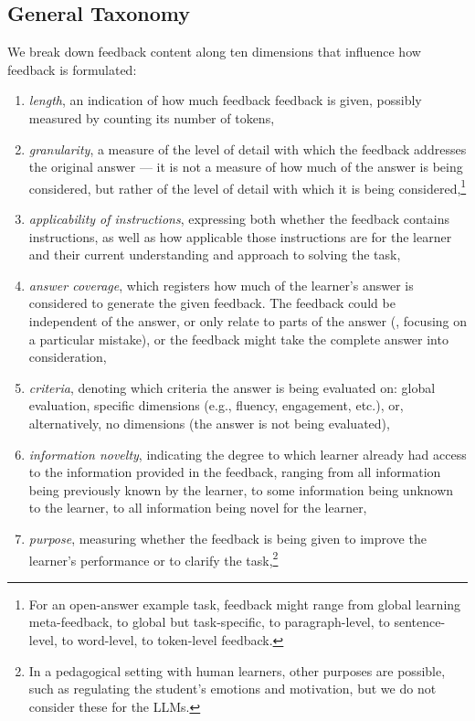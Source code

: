 \subsection{General Taxonomy}
\label{ssec:general_taxonomy}
We break down feedback content along ten dimensions that influence how feedback is formulated: 
\begin{enumerate}[itemsep=0.05em]
    \item \textit{length}, an indication of how much feedback feedback is given, possibly measured by counting its number of tokens,
    \item \textit{granularity}, a measure of the level of detail with which the feedback addresses the original answer --- it is not a measure of how much of the answer is being considered, but rather of the level of detail with which it is being considered,\footnote{For an open-answer example task, feedback might range from global learning meta-feedback, to global but task-specific, to paragraph-level, to sentence-level, to word-level, to token-level feedback.}
    \item \textit{applicability of instructions}, expressing both whether the feedback contains instructions, as well as how applicable those instructions are for the learner and their current understanding and approach to solving the task,
    \item \textit{answer coverage}, which registers how much of the learner's answer is considered to generate the given feedback. The feedback could be independent of the answer, or only relate to parts of the answer (\eg, focusing on a particular mistake), or the feedback might take the complete answer into consideration,
    \item \textit{criteria}, denoting which criteria the answer is being evaluated on: global evaluation, specific dimensions (e.g., fluency, engagement, etc.), or, alternatively, no  dimensions (the answer is not being evaluated),
    \item \textit{information novelty}, indicating the degree to which learner already had access to the information provided in the feedback, ranging from all information being previously known by the learner, to some information being unknown to the learner, to all information being novel for the learner,
    \item \textit{purpose}, measuring whether the feedback is being given to improve the learner's performance or to clarify the task,\footnote{In a pedagogical setting with human learners, other purposes are possible, such as regulating the student's emotions and motivation, but we do not consider these for the LLMs.}

\end{enumerate}
